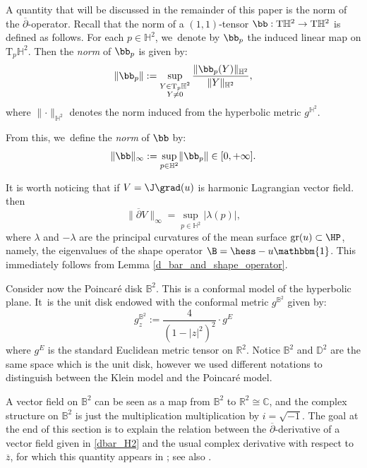 A quantity that will be discussed in the remainder of this paper is the norm of the $\overline{\partial}$-operator. Recall that the norm of a $(1,1)$-tensor $\bb: \mathrm{T}\mathbb{H}^2 \to \mathrm{T}\mathbb{H}^2$ is defined as follows. For each $p \in \mathbb{H}^2$, we~denote by $\bb_p$ the induced linear map on $\mathrm{T}_p\mathbb{H}^2$. Then the \emph{norm} of $\bb_p$ is given by:
\begin{equation}\label{norme}
\lVert \bb_p \rVert := \sup_{\substack{Y\in\mathrm{T}_p\mathbb{H}^2\\Y\neq 0}} \frac{\lVert \bb_p(Y) \rVert_{\mathbb{H}^2}}{\lVert Y \rVert_{\mathbb{H}^2}},
\end{equation}
where $\lVert \cdot \rVert_{\mathbb{H}^2}$ denotes the norm induced from the hyperbolic metric $g^{\mathbb{H}^2}$.

From this, we~define the \emph{norm} of $\bb$ by:
\[
\lVert \bb \rVert_{\infty} := \sup_{p \in \mathbb{H}^2} \lVert \bb_p \rVert \in [0, +\infty].
\]

\begin{remark}\label{principal_curvature}
It is worth noticing that if $V=\J\grad(u)$ is harmonic Lagrangian vector field. then
\[
\lVert \overline{\partial}V\rVert_{\infty}=\sup_{p\in\mathbb{H}^2}\lvert\lambda(p)\rvert,
\]
where $\lambda$ and $-\lambda$ are the principal curvatures of the mean surface $\mathrm{gr}(u)\subset\HP$, namely, the eigenvalues of the shape operator $\B=\hess-u\mathbbm{1}$. This immediately follows from Lemma \ref{d_bar_and_shape_operator}.
\end{remark}

Consider now the Poincaré disk $\mathbb{B}^2$. This is a conformal model of the hyperbolic plane. It~is the unit disk endowed with the conformal metric $g^{\mathbb{B}^2}$ given by:
\[
g^{\mathbb{B}^2}_{z}:=\frac{4}{(1-\lvert z\rvert^2)^2}\cdot g^{E}
\]
where $g^E$ is the standard Euclidean metric tensor on $\mathbb{R}^2$. Notice $\mathbb{B}^2$ and $\mathbb{D}^2$ are the same space which is the unit disk, however we used different notations to distinguish between the Klein model and the Poincaré model.

A vector field on $\mathbb{B}^2$ can be seen as a map from $\mathbb{B}^2$ to $\mathbb{R}^2\cong\mathbb{C}$, and the complex structure on $\mathbb{B}^2$ is just the multiplication multiplication by $i=\sqrt{-1}$. The goal at the end of this section is to explain the relation between the $\overline{\partial}$-derivative of a vector field given in \eqref{dbar_H2} and the usual complex derivative with respect to $\overline{z}$, for which this quantity appears in \cite{Extension_with_bounded_derivative}; see also \cite{FanJun}.

